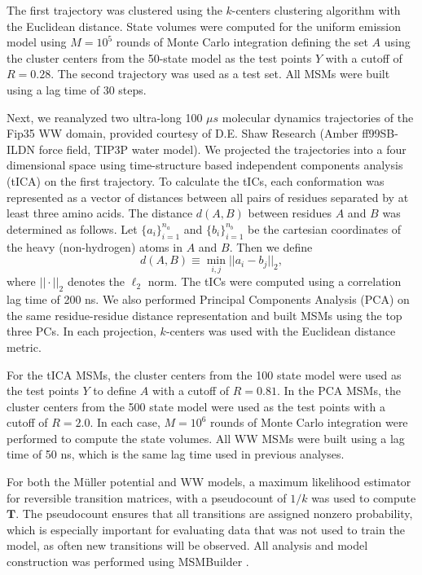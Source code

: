 \documentclass[journal=jpcbfk, layout=traditional, manuscript=article]{achemso}
\begin{document}
The first trajectory was clustered using the $k$-centers clustering algorithm with the Euclidean distance. State volumes were computed for the uniform emission model using $M=10^5$ rounds of Monte Carlo integration defining the set $A$ using the cluster centers from the 50-state model as the test points $Y$ with a cutoff of $R=0.28$. The second trajectory was used as a test set. All MSMs were built using a lag time of 30 steps.

Next, we reanalyzed two ultra-long 100 $\mu s$ molecular dynamics trajectories of the Fip35 WW domain\cite{Liu2008Experimental}, provided courtesy of D.E. Shaw Research \cite{Shaw2010Atomic} (Amber ff99SB-ILDN force field,\cite{amber} TIP3P water model\cite{tip3p}). We projected the trajectories into a four dimensional space using time-structure based independent components analysis (tICA) \cite{Schwantes2013Improvements, Perez2013Identification} on the first trajectory. To calculate the tICs, each conformation was represented as a vector of distances between all pairs of residues separated by at least three amino acids. The distance $d(A, B)$ between residues $A$ and $B$ was determined as follows. Let $\{a_i\}_{i=1}^{n_a}$ and $\{b_i\}_{i=1}^{n_b}$ be the cartesian coordinates of the heavy (non-hydrogen) atoms in $A$ and $B$. Then we define
$$
d(A,B) \equiv \min_{i, j} ||a_i - b_j||_2,
$$ where $|| \cdot ||_2$ denotes the $\ell_2$ norm. The tICs were computed using a correlation lag time of 200 ns. We also performed Principal Components Analysis (PCA) on the same residue-residue distance representation and built MSMs using the top three PCs. In each projection, $k$-centers was used with the Euclidean distance metric.

For the tICA MSMs, the cluster centers from the 100 state model were used as the test points $Y$ to define $A$ with a cutoff of $R=0.81$. In the PCA MSMs, the cluster centers from the 500 state model were used as the test points with a cutoff of $R=2.0$. In each case, $M=10^6$ rounds of Monte Carlo integration were performed to compute the state volumes. All WW MSMs were built using a lag time of 50 ns, which is the same lag time used in previous analyses\cite{Beauchamp2012Simple}.

For both the M\"{u}ller potential and WW models, a maximum likelihood estimator for reversible transition matrices, with a pseudocount of $1 / k$ was used to compute $\mathbf{T}$. The pseudocount ensures that all transitions are assigned nonzero probability, which is especially important for evaluating data that was not used to train the model, as often new transitions will be observed. All analysis and model construction was performed using MSMBuilder \cite{Beauchamp2011Msmbuilder2}.
\end{document}
